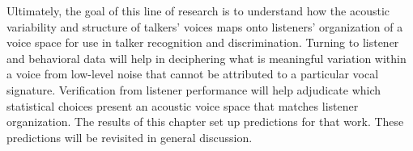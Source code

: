 Ultimately, the goal of this line of research is to understand how the acoustic variability and structure of talkers' voices maps onto listeners' organization of a voice space for use in talker recognition and discrimination. Turning to listener and behavioral data will help in deciphering what is meaningful variation within a voice from low-level noise that cannot be attributed to a particular vocal signature. Verification from listener performance will help adjudicate which statistical choices present an acoustic voice space that matches listener organization. The results of this chapter set up predictions for that work. These predictions will be revisited in general discussion.

\endinput %
